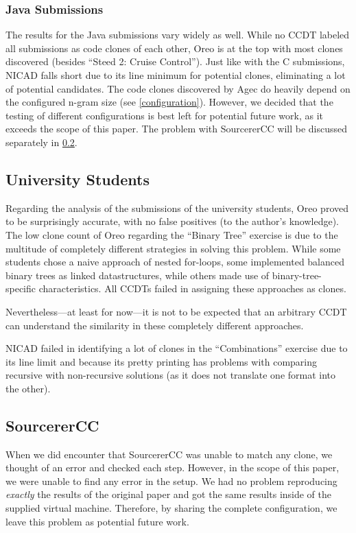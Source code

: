 \documentclass[10pt,journal,compsoc]{IEEEtran}
\def\todo#1{\textcolor{brown!80!yellow!70!black!90!red}{[\textsc{todo}: \textsf{#1}]}}
\begin{document}
\subsubsection{Java Submissions}
The results for the Java submissions vary widely as well. While no CCDT labeled all submissions as code clones of each other, Oreo is at the top with most clones discovered (besides \enquote{Steed 2: Cruise Control}).
Just like with the C submissions, NICAD falls short due to its line minimum for potential clones, eliminating a lot of potential candidates.
The code clones discovered by Agec do heavily depend on the configured n-gram size (see \cref{configuration}).
However, we decided that the testing of different configurations is best left for potential future work, as it exceeds the scope of this paper.
The problem with SourcererCC will be discussed separately in \cref{problem:SourcererCC}.

\subsection{University Students}
Regarding the analysis of the submissions of the university students, Oreo proved to be surprisingly accurate, with no false positives (to the author's knowledge).
The low clone count of Oreo regarding the \enquote{Binary Tree} exercise is due to the multitude of completely different strategies in solving this problem.
While some students chose a naive approach of nested for-loops, some implemented balanced binary trees as linked datastructures, while others made use of binary-tree-specific characteristics.
All CCDTs failed in assigning these approaches as clones.

Nevertheless---at least for now---it is not to be expected that an arbitrary CCDT can understand the similarity in these completely different approaches.

NICAD failed in identifying a lot of clones in the \enquote{Combinations} exercise due to its line limit and because its pretty printing has problems with comparing recursive with non-recursive solutions (as it does not translate one format into the other).

\subsection{SourcererCC}\label{problem:SourcererCC}
When we did encounter that SourcererCC was unable to match any clone, we thought of an error and checked each step. However, in the scope of this paper, we were unable to find any error in the setup.
We had no problem reproducing \textit{exactly} the results of the original paper and got the same results inside of the supplied virtual machine.
Therefore, by sharing the complete configuration, we leave this problem as potential future work.
\end{document}

